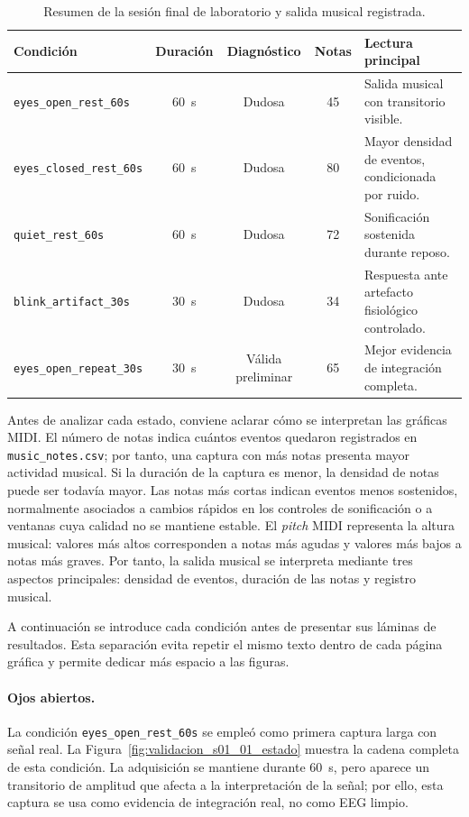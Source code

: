 \begin{table}[!htbp]
    \centering
    \small
    \caption{Resumen de la sesión final de laboratorio y salida musical registrada.}
    \label{tab:validacion_sesion_final_musica}
    \begin{tabular}{p{} c c c p{}}
        \hline
        \textbf{Condición} & \textbf{Duración} & \textbf{Diagnóstico} & \textbf{Notas} & \textbf{Lectura principal} \\
        \hline
        \texttt{eyes\_open\_rest\_60s} & \SI{60}{\second} & Dudosa & 45 & Salida musical con transitorio visible. \\
        \texttt{eyes\_closed\_rest\_60s} & \SI{60}{\second} & Dudosa & 80 & Mayor densidad de eventos, condicionada por ruido. \\
        \texttt{quiet\_rest\_60s} & \SI{60}{\second} & Dudosa & 72 & Sonificación sostenida durante reposo. \\
        \texttt{blink\_artifact\_30s} & \SI{30}{\second} & Dudosa & 34 & Respuesta ante artefacto fisiológico controlado. \\
        \texttt{eyes\_open\_repeat\_30s} & \SI{30}{\second} & Válida preliminar & 65 & Mejor evidencia de integración completa. \\
        \hline
    \end{tabular}
\end{table}

Antes de analizar cada estado, conviene aclarar cómo se interpretan las gráficas MIDI. El número de notas indica cuántos eventos quedaron registrados en \texttt{music\_notes.csv}; por tanto, una captura con más notas presenta mayor actividad musical. Si la duración de la captura es menor, la densidad de notas puede ser todavía mayor. Las notas más cortas indican eventos menos sostenidos, normalmente asociados a cambios rápidos en los controles de sonificación o a ventanas cuya calidad no se mantiene estable. El \textit{pitch} MIDI representa la altura musical: valores más altos corresponden a notas más agudas y valores más bajos a notas más graves. Por tanto, la salida musical se interpreta mediante tres aspectos principales: densidad de eventos, duración de las notas y registro musical.

A continuación se introduce cada condición antes de presentar sus láminas de resultados. Esta separación evita repetir el mismo texto dentro de cada página gráfica y permite dedicar más espacio a las figuras.

\paragraph{Ojos abiertos.}
La condición \texttt{eyes\_open\_rest\_60s} se empleó como primera captura larga con señal real. La Figura~\ref{fig:validacion_s01_01_estado} muestra la cadena completa de esta condición. La adquisición se mantiene durante \SI{60}{\second}, pero aparece un transitorio de amplitud que afecta a la interpretación de la señal; por ello, esta captura se usa como evidencia de integración real, no como EEG limpio.

